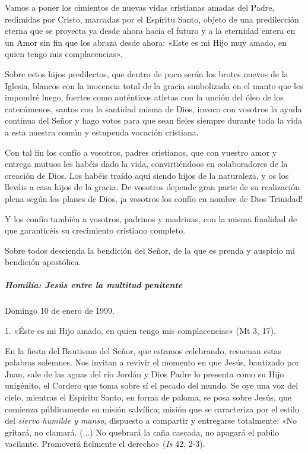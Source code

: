 \documentclass[]{article}
\let\oldsubparagraph\subparagraph
\renewcommand{\subparagraph}[1]{\oldsubparagraph{#1}\mbox{}}
\begin{document}
Vamos a poner los cimientos de nuevas vidas cristianas amadas del Padre,
redimidas por Cristo, marcadas por el Espíritu Santo, objeto de una
predilección eterna que se proyecta ya desde ahora hacia el futuro y a
la eternidad entera en un Amor sin fin que los abraza desde ahora: «Este
es mi Hijo muy amado, en quien tengo mis complacencias».

Sobre estos hijos predilectos, que dentro de poco serán los brotes
nuevos de la Iglesia, blancos con la inocencia total de la gracia
simbolizada en el manto que les impondré luego, fuertes como auténticos
atletas con la unción del óleo de los catecúmenos, santos con la
santidad misma de Dios, invoco con vosotros la ayuda continua del Señor
y hago votos para que sean fieles siempre durante toda la vida a esta
nuestra común y estupenda vocación cristiana.

Con tal fin los confío a vosotros, padres cristianos, que con vuestro
amor y entrega mutuos les habéis dado la vida, convirtiéndoos en
colaboradores de la creación de Dios. Los habéis traído aquí siendo
hijos de la naturaleza, y os los lleváis a casa hijos de la gracia. De
vosotros depende gran parte de su realización plena según los planes de
Dios, ¡a vosotros los confío en nombre de Dios Trinidad!

Y los confío también a vosotros, padrinos y madrinas, con la misma
finalidad de que garanticéis su crecimiento cristiano completo.

Sobre todos descienda la bendición del Señor, de la que es prenda y
auspicio mi bendición apostólica.

\subparagraph{Homilía: Jesús entre la multitud
penitente}\label{homiluxeda-jesuxfas-entre-la-multitud-penitente}

Domingo 10 de enero de 1999.

1. «Éste es mi Hijo amado, en quien tengo mis complacencias» (Mt 3, 17).

En la fiesta del Bautismo del Señor, que estamos celebrando, resuenan
estas palabras solemnes. Nos invitan a revivir el momento en que Jesús,
bautizado por Juan, sale de las aguas del río Jordán y Dios Padre lo
presenta como su Hijo unigénito, el Cordero que toma sobre sí el pecado
del mundo. Se oye una voz del cielo, mientras el Espíritu Santo, en
forma de paloma, se posa sobre Jesús, que comienza públicamente su
misión salvífica; misión que se caracteriza por el estilo del
\emph{siervo humilde y manso}, dispuesto a compartir y entregarse
totalmente: «No gritará, no clamará. (...) No quebrará la caña cascada,
no apagará el pabilo vacilante. Promoverá fielmente el derecho»
(\emph{Is} 42, 2-3).
\end{document}
